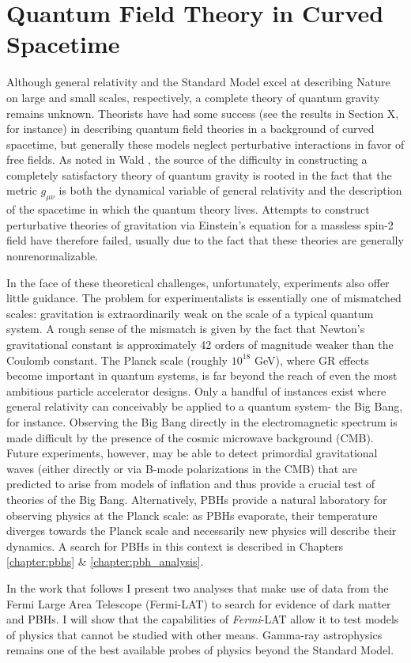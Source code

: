 \section{Quantum Field Theory in Curved Spacetime}
Although general relativity and the Standard Model excel at describing Nature on large and small scales, respectively, a complete theory of quantum gravity remains unknown. Theorists have had some success (see the results in Section X, for instance) in describing quantum field theories in a background of curved spacetime, but generally these models neglect perturbative interactions in favor of free fields. 
As noted in Wald \cite{wald_general_1984}, the source of the difficulty in constructing a completely satisfactory theory of quantum gravity is rooted in the fact that the metric $g_{\mu\nu}$ is both the dynamical variable of general relativity and the description of the spacetime in which the quantum theory lives.
Attempts to construct perturbative theories of gravitation via Einstein's equation for a massless spin-2 field have therefore failed, usually due to the fact that these theories are generally nonrenormalizable.

In the face of these theoretical challenges, unfortunately, experiments also offer little guidance.
The problem for experimentalists is essentially one of mismatched scales: gravitation is extraordinarily weak on the scale of a typical quantum system.
A rough sense of the mismatch is given by the fact that Newton's gravitational constant is approximately 42 orders of magnitude weaker than the Coulomb constant.
The Planck scale (roughly $10^{18}$ GeV), where GR effects become important in quantum systems, is far beyond the reach of even the most ambitious particle accelerator designs.
Only a handful of instances exist where general relativity can conceivably be applied to a quantum system- the Big Bang, for instance.
Observing the Big Bang directly in the electromagnetic spectrum is made difficult by the presence of the cosmic microwave background (CMB).
Future experiments, however, may be able to detect primordial gravitational waves (either directly or via B-mode polarizations in the CMB) that are predicted to arise from models of inflation and thus provide a crucial test of theories of the Big Bang.
Alternatively, PBHs provide a natural laboratory for observing physics at the Planck scale: as PBHs evaporate, their temperature diverges towards the Planck scale and necessarily new physics will describe their dynamics. A search for PBHs in this context is described in Chapters \ref{chapter:pbhs} \& \ref{chapter:pbh_analysis}.

In the work that follows I present two analyses that make use of data from the Fermi Large Area Telescope (Fermi-LAT) to search for evidence of dark matter and PBHs. I will show that the capabilities of {\it{Fermi}}-LAT allow it to test models of physics that cannot be studied with other means. Gamma-ray astrophysics remains one of the best available probes of physics beyond the Standard Model.

